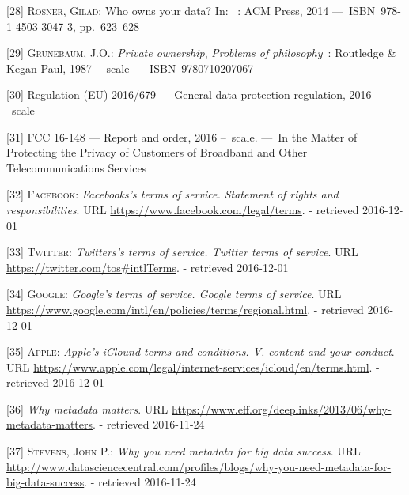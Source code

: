 \documentclass[12pt,english,a4paper,titlepage,cleardoublepage=empty,dottedtoc]{report}
\begin{document}
\hypertarget{ref-paper_2014_who-owns-yours-data}{}
{[}28{]} \textsc{Rosner, Gilad}: Who owns your data? In: ~: ACM Press,
2014 ---~ISBN~978-1-4503-3047-3, pp.~623--628

\hypertarget{ref-book_1987_private-ownership_definition}{}
{[}29{]} \textsc{Grunebaum, J.O.}: \emph{Private ownership},
\emph{Problems of philosophy}~: Routledge \& Kegan Paul, 1987 --~scale
---~ISBN~9780710207067

\hypertarget{ref-regulation_2016_eu_general-data-protection-regulation_ownership}{}
{[}30{]} Regulation (EU) 2016/679 --- General data protection
regulation, 2016 --~scale

\hypertarget{ref-rules_2016_fcc_to-protect-broadband-consumer-privacy_ownership}{}
{[}31{]} FCC 16-148 --- Report and order, 2016 --~scale. ---~In the
Matter of Protecting the Privacy of Customers of Broadband and Other
Telecommunications Services

\hypertarget{ref-web_2016_facebook_terms-of-service}{}
{[}32{]} \textsc{Facebook}: \emph{Facebooks's terms of service.
Statement of rights and responsibilities}. URL
\url{https://www.facebook.com/legal/terms}. - retrieved 2016-12-01

\hypertarget{ref-web_2016_twitter_terms-of-service}{}
{[}33{]} \textsc{Twitter}: \emph{Twitters's terms of service. Twitter
terms of service}. URL \url{https://twitter.com/tos\#intlTerms}. -
retrieved 2016-12-01

\hypertarget{ref-web_2016_google_terms-of-service}{}
{[}34{]} \textsc{Google}: \emph{Google's terms of service. Google terms
of service}. URL
\url{https://www.google.com/intl/en/policies/terms/regional.html}. -
retrieved 2016-12-01

\hypertarget{ref-web_2016_apple-icloud_terms-of-service}{}
{[}35{]} \textsc{Apple}: \emph{Apple's iClound terms and conditions. V.
content and your conduct}. URL
\url{https://www.apple.com/legal/internet-services/icloud/en/terms.html}.
- retrieved 2016-12-01

\hypertarget{ref-web_2013_why-metadata-matters}{}
{[}36{]} \emph{Why metadata matters}. URL
\url{https://www.eff.org/deeplinks/2013/06/why-metadata-matters}. -
retrieved 2016-11-24

\hypertarget{ref-web_2016_why-you-need-metadata-for-big-data-to-success}{}
{[}37{]} \textsc{Stevens, John P.}: \emph{Why you need metadata for big
data success}. URL
\url{http://www.datasciencecentral.com/profiles/blogs/why-you-need-metadata-for-big-data-success}.
- retrieved 2016-11-24
\end{document}

